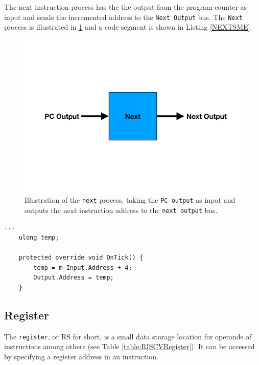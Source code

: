         The next instruction process has the the output from the program counter as input and sends the incremented address to the \texttt{Next Output} bus. The \texttt{Next} process is illustrated in \ref{fig:NEXT} and a code segment is shown in Listing \ref{NEXTSME}.
        
        \begin{figure}[h!]
            \centering
            \includegraphics[scale=0.34]{pictures/Next.pdf}
            \caption{Illustration of the \texttt{next} process, taking the \texttt{PC output} as input and outputs the next instruction address to the \texttt{next output} bus.}
            \label{fig:NEXT}
        \end{figure}
    
        \begin{minipage}{\linewidth}
            \begin{lstlisting}[language={[Sharp]C}, caption={A slice of the \texttt{Next} process SME code. Here we declare a temporary varible, which contains the program counter output. We increment the temporary variable by four and place it in the output bus.},captionpos=b, label = NEXTSME]
...
    ulong temp;
    
    protected override void OnTick() {
        temp = m_Input.Address + 4;
        Output.Address = temp;
    }
            \end{lstlisting}
        \end{minipage}  
        
    
    \subsection{Register}
        The \texttt{register}, or RS for short, is a small data storage location for operands of instructions among others (see Table \ref{table:RISCVRegister}). It can be accessed by specifying a register address in an instruction. 
        
